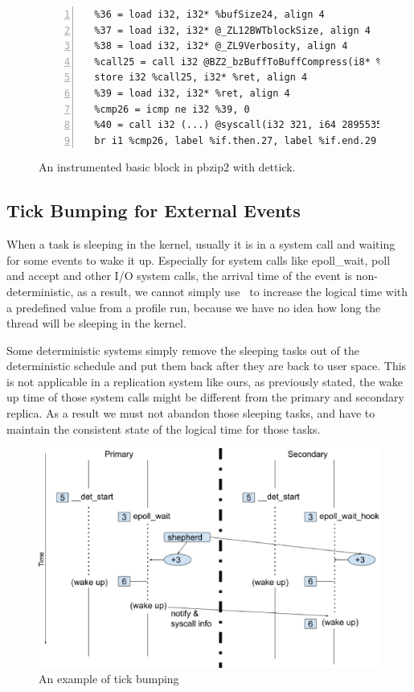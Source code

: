\begin{figure}
\centering
\begin{lstlisting}[numbers=left, frame=single, basicstyle=\small, breaklines]
  %bufSize24 = getelementptr inbounds %struct.outBuff, %struct.outBuff* %35, i32 0, i32 1
  %36 = load i32, i32* %bufSize24, align 4
  %37 = load i32, i32* @_ZL12BWTblockSize, align 4
  %38 = load i32, i32* @_ZL9Verbosity, align 4
  %call25 = call i32 @BZ2_bzBuffToBuffCompress(i8* %32, i32* %outSize, i8* %34, i32 %36, i32 %37, i32 %38, i32 30)
  store i32 %call25, i32* %ret, align 4
  %39 = load i32, i32* %ret, align 4
  %cmp26 = icmp ne i32 %39, 0
  %40 = call i32 (...) @syscall(i32 321, i64 2895535)
  br i1 %cmp26, label %if.then.27, label %if.end.29

\end{lstlisting}
\caption{An instrumented basic block in pbzip2 with dettick.}
\label{fig:instrumented}
\end{figure}

\newpage


\subsection{Tick Bumping for External Events}

When a task is sleeping in the kernel, usually it is in a system call and waiting for some events to wake it up. Especially for system calls like epoll\_wait, poll and accept and other I/O system calls, the arrival time of the event is non-deterministic, as a result, we cannot simply use \dettick\ to increase the logical time with a predefined value from a profile run, because we have no idea how long the thread will be sleeping in the kernel.

Some deterministic systems simply remove the sleeping tasks out of the deterministic schedule and put them back after they are back to user space. This is not applicable in a replication system like ours, as previously stated, the wake up time of those system calls might be different from the primary and secondary replica. As a result we must not abandon those sleeping tasks, and have to maintain the consistent state of the logical time for those tasks.

\begin{figure}
\centering
\includegraphics[width=0.8\columnwidth]{figures/tickbump}
\caption{An example of tick bumping}
\label{f:tick_bump}
\end{figure}


